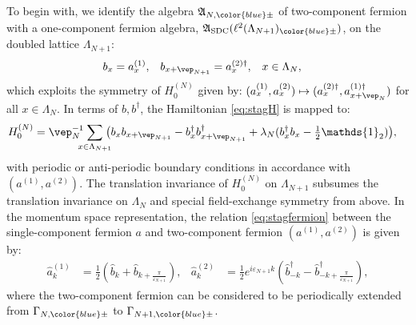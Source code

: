 \documentclass[a4paper, 11pt]{article}
\newcommand{\fA}{\mathfrak{A}}\newcommand{\cA}{\mathcal{A}}\newcommand{\dA}{\mathds{A}}\newcommand{\sA}{\mathscr{A}}
\newcommand{\ltwo}{\ell^{2}}
\DeclareMathOperator{\1}{\mathds{1}}
\DeclareMathOperator{\SDC}{\textup{SDC}}
\begin{document}
To begin with, we identify the algebra $\fA_{N,{\color{blue}\pm}}$ of two-component fermion with a one-component fermion algebra, $\fA_{\SDC}(\ltwo(\Lambda_{N+1})_{{\color{blue}\pm}})$, on the doubled lattice $\Lambda_{N+1}$:
\begin{align}
\label{eq:stagfermion}
b_{x} & = a^{(1)}_{x}, & b_{x+\vep_{N+1}} & = a^{(2)\dag}_{x}, & x & \in\Lambda_{N},
\end{align}
which exploits the symmetry of $H^{(N)}_{0}$ given by: $(a^{(1)}_{x},a^{(2)}_{x})\mapsto(a^{(2)\dag}_{x}, a^{(1)\dag}_{x+\vep_{N}})$ for all $x\in\Lambda_{N}$. In terms of $b, b^{\dag}$, the Hamiltonian \eqref{eq:stagH} is mapped to:
\begin{align}
\label{eq:stagH1c}
H^{(N)}_{0} & = \vep_{N}^{-1}\hspace{-0.25cm}\sum_{x\in\Lambda_{N+1}}\hspace{-0.25cm}\big(b_{x}b_{x+\vep_{N+1}}-b^{\dag}_{x}b^{\dag}_{x+\vep_{N+1}}+\lambda_{N}(b^{\dag}_{x}b_{x}-\tfrac{1}{2}\mathds{1}_{2})\big),
\end{align}
with periodic or anti-periodic boundary conditions in accordance with $(a^{(1)},a^{(2)})$. The translation invariance of $H^{(N)}_{0}$ on $\Lambda_{N+1}$ subsumes the translation invariance on $\Lambda_{N}$ and special field-exchange symmetry from above. In the momentum space representation, the relation \eqref{eq:stagfermion} between the single-component fermion $a$ and two-component fermion $(a^{(1)},a^{(2)})$ is given by:
\begin{align}
\label{eq:stagfermionfourier}
\hat{a}^{(1)}_{k} & = \tfrac{1}{2}(\hat{b}_{k}+\hat{b}_{k+\frac{\pi}{\varepsilon_{N+1}}}), & \hat{a}^{(2)}_{k} & = \tfrac{1}{2}e^{i\varepsilon_{N+1}k}(\hat{b}^{\dag}_{-k}-\hat{b}^{\dag}_{-k+\frac{\pi}{\varepsilon_{N+1}}}),
\end{align}
where the two-component fermion can be considered to be periodically extended from $\Gamma_{N,{\color{blue}\pm}}$ to $\Gamma_{N+1,{\color{blue}\pm}}$.

\bigskip
\end{document}
